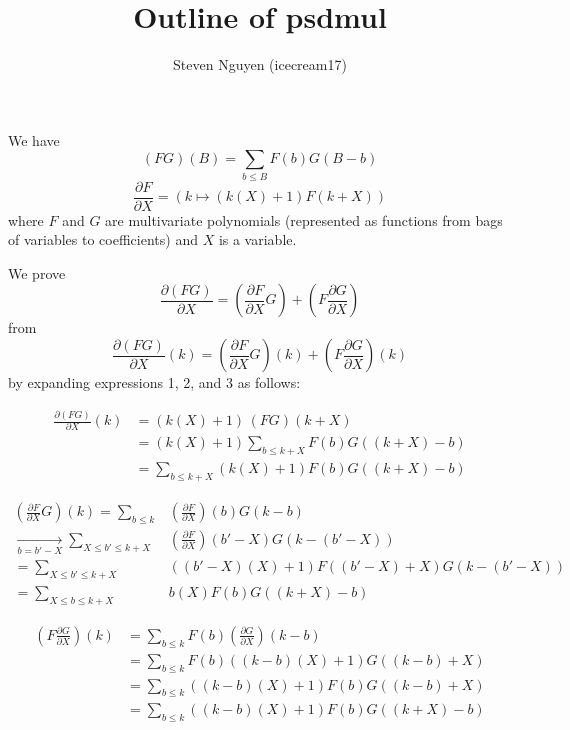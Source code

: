 \documentclass[]{article}
\title{Outline of psdmul}
\author{Steven Nguyen (icecream17)}
\begin{document}
\maketitle

\noindent{}We have
\[
    (FG)(B) = \sum_{b \le B} F(b) G(B-b) \tag{mul}\label{mul}
\]
\[
    \frac{\partial F}{\partial X} = \left( k \mapsto \left(k(X) + 1\right) F(k+X) \right) \tag{psd}\label{psd}
\]
where $F$ and $G$ are multivariate polynomials (represented as functions from bags of variables to coefficients) and $X$ is a variable.

\noindent{}\hrulefill

\noindent{}We prove
\[
    \frac{\partial (FG)}{\partial X} = \left( \frac{\partial F}{\partial X} G \right) + \left( F \frac{\partial G}{\partial X} \right)
\]
from
\[
    \frac{\partial (FG)}{\partial X}(k) = \left( \frac{\partial F}{\partial X} G \right)\!\!(k) + \left( F \frac{\partial G}{\partial X} \right)\!\!(k) \tag{1 = 2 + 3}
\]
by expanding expressions 1, 2, and 3 as follows:

\vspace{-1em}
\begin{align*}
\frac{\partial (FG)}{\partial X}(k)  &= (k(X) + 1) \, (FG)(k+X) \\
&= (k(X) + 1) \sum_{b \le k+X} F(b) G((k+X)-b) \\
&= \sum_{b \le k+X} (k(X) + 1) F(b) G((k+X)-b)  \tag{1}\label{1}
\end{align*}
\hrulefill

\vspace{-1em}
\begin{align*}
\left( \frac{\partial F}{\partial X} G \right)\!\!(k)
= \sum_{b \le k}& \left( \frac{\partial F}{\partial X} \right)\!\!(b) G(k-b) \\
\underset{b = b' - X}{\longrightarrow} \sum_{X \le b' \le k+X}& \left( \frac{\partial F}{\partial X} \right)\!\!(b'-X) G(k-(b'-X)) \\
= \sum_{X \le b' \le k+X}& ((b'-X)(X) + 1) F((b'-X)+X) G(k-(b'-X)) \\
= \sum_{X \le b \le k+X}& b(X) F(b) G((k+X)-b)  \tag{2}\label{2}
\end{align*}
\hrulefill

\vspace{-1em}
\begin{align*}
\left( F \frac{\partial G}{\partial X} \right)\!\!(k)
&= \sum_{b \le k} F(b) \left( \frac{\partial G}{\partial X} \right)\!\!(k-b) \\
&= \sum_{b \le k} F(b) ((k-b)(X) + 1) G((k-b)+X) \\
&= \sum_{b \le k} ((k-b)(X) + 1) F(b) G((k-b)+X) \\
&= \sum_{b \le k} ((k-b)(X) + 1) F(b) G((k+X)-b)  \tag{3}\label{3}
\end{align*}
\hrulefill
\end{document}
